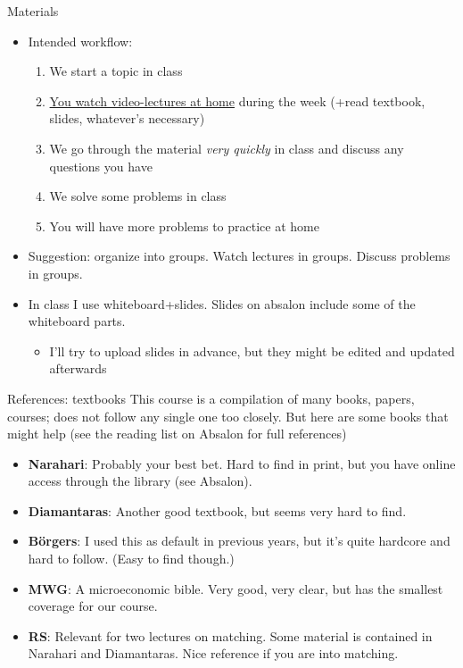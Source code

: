 \documentclass[english,10pt
,aspectratio=169
]{beamer}
\begin{document}
\begin{frame}{Materials}
	\begin{itemize}
		\item Intended workflow: 
		\begin{enumerate}
			\item We start a topic in class
			\item \uline{You watch video-lectures at home} during the week (+read textbook, slides, whatever's necessary)
			\item We go through the material \emph{very quickly} in class and discuss any questions you have
			\item We solve some problems in class
			\item You will have more problems to practice at home
		\end{enumerate}
		\pause
		\item Suggestion: organize into groups. Watch lectures in groups. Discuss problems in groups.
		\pause
		\item In class I use whiteboard+slides. Slides on absalon include some of the whiteboard parts.
		\begin{itemize}
			\item I'll try to upload slides in advance, but they might be edited and updated afterwards
		\end{itemize}
	\end{itemize}
\end{frame}


\begin{frame}{References: textbooks}
	This course is a compilation of many books, papers, courses; does not follow any single one too closely. But here are some books that might help (see the reading list on Absalon for full references)
	\begin{itemize}%
		\item \textbf{Narahari}: Probably your best bet. Hard to find in print, but you have online access through the library (see Absalon).
		\item \textbf{Diamantaras}: Another good textbook, but seems very hard to find.
		\item \textbf{B\"{o}rgers}: I used this as default in previous years, but it's quite hardcore and hard to follow. (Easy to find though.)
		\item \textbf{MWG}: A microeconomic bible. Very good, very clear, but has the smallest coverage for our course.
		\item \textbf{RS}: Relevant for two lectures on matching. Some material is contained in Narahari and Diamantaras. Nice reference if you are into matching.
	\end{itemize}
\end{frame}
\end{document}
